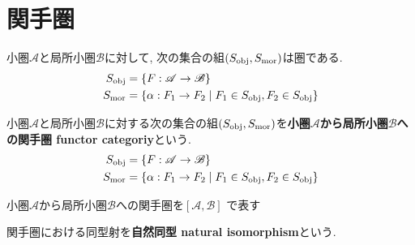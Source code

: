 \section{関手圏}
\begin{Prop}
小圏$\mathscr{A}$と局所小圏$\mathscr{B}$に対して, 次の集合の組$(S_{\rm obj},S_{\rm mor})$は圏である.
\begin{align*}
S_{\rm obj}&=\{F:\mathscr{A}\rightarrow\mathscr{B}\}\\
S_{\rm mor}&=\{\alpha:F_1\rightarrow F_2\mid F_1\in S_{\rm obj},F_2\in S_{\rm obj}\}
\end{align*}
\end{Prop}
\begin{Def}
小圏$\mathscr{A}$と局所小圏$\mathscr{B}$に対する次の集合の組$(S_{\rm obj},S_{\rm mor})$を{\bf 小圏$\mathscr{A}$から局所小圏$\mathscr{B}$への関手圏 functor categoriy}という.
\begin{align*}
S_{\rm obj}&=\{F:\mathscr{A}\rightarrow\mathscr{B}\}\\
S_{\rm mor}&=\{\alpha:F_1\rightarrow F_2\mid F_1\in S_{\rm obj},F_2\in S_{\rm obj}\}
\end{align*}

\end{Def}
\begin{Notation}
小圏$\mathscr{A}$から局所小圏$\mathscr{B}$への関手圏を$[\mathscr{A},\mathscr{B}]$
で表す\end{Notation}
\begin{Def}
関手圏における同型射を{\bf 自然同型 
 natural isomorphism}という.
\end{Def}
\begin{comment}
\begin{Prop}
自然変換...が自然同型であること,

...が同型者であることは同値である.
\end{Prop}
\end{comment}